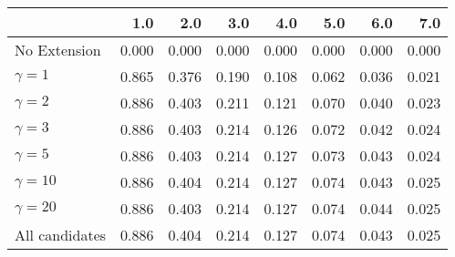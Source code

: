 \begin{tabular}{lrrrrrrr}
\toprule
{} &   1.0 &   2.0 &   3.0 &   4.0 &   5.0 &   6.0 &   7.0 \\
\midrule
No Extension   & 0.000 & 0.000 & 0.000 & 0.000 & 0.000 & 0.000 & 0.000 \\
$\gamma = 1$   & 0.865 & 0.376 & 0.190 & 0.108 & 0.062 & 0.036 & 0.021 \\
$\gamma = 2$   & 0.886 & 0.403 & 0.211 & 0.121 & 0.070 & 0.040 & 0.023 \\
$\gamma = 3$   & 0.886 & 0.403 & 0.214 & 0.126 & 0.072 & 0.042 & 0.024 \\
$\gamma = 5$   & 0.886 & 0.403 & 0.214 & 0.127 & 0.073 & 0.043 & 0.024 \\
$\gamma = 10$  & 0.886 & 0.404 & 0.214 & 0.127 & 0.074 & 0.043 & 0.025 \\
$\gamma = 20$  & 0.886 & 0.403 & 0.214 & 0.127 & 0.074 & 0.044 & 0.025 \\
All candidates & 0.886 & 0.404 & 0.214 & 0.127 & 0.074 & 0.043 & 0.025 \\
\bottomrule
\end{tabular}
